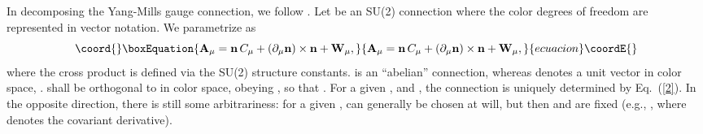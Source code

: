 \documentclass[a4paper,12pt]{article}
\providecommand{\re}[1]{~(\ref{#1})}\usepackage{useful_macros}
\begin{document}
In decomposing the Yang-Mills gauge connection, we follow
\cite{Cho:1980nv,Shabanov:1999xy,Shabanov:1999uv}. Let \myHighlight{$\mA_\mu$}\coordHE{} be an
SU(2) connection where the color degrees of freedom are represented in
vector notation. We parametrize \myHighlight{$\mA_\mu$}\coordHE{} as
\begin{equation}\coord{}\boxEquation{
\mA_\mu=\mn\, C_\mu +(\partial_\mu\mn)\times\mn +\mW_\mu,\label{2}
}{
\mA_\mu=\mn\, C_\mu +(\partial_\mu\mn)\times\mn +\mW_\mu,}{ecuacion}\coordE{}\end{equation}
where the cross product is defined via the SU(2) structure constants.
\coordHE{} is an ``abelian'' connection, whereas \myHighlight{$\mn$}\coordHE{} denotes a unit
vector in color space, \coordHE{}. \myHighlight{$\mW_\mu$}\coordHE{} shall be orthogonal
to \myHighlight{$\mn$}\coordHE{} in color space, obeying \coordHE{}, so that
\coordHE{}. For a given \myHighlight{$\mn$}\coordHE{}, \coordHE{} and \myHighlight{$\mW_\mu$}\coordHE{}, the
connection \myHighlight{$\mA_\mu$}\coordHE{} is uniquely determined by Eq.\re{2}. In the
opposite direction, there is still some arbitrariness: for a given
\myHighlight{$\mA_\mu$}\coordHE{}, \myHighlight{$\mn$}\coordHE{} can generally be chosen at will, but then \coordHE{} and
\myHighlight{$\mW_\mu$}\coordHE{} are fixed (e.g., \coordHE{}, where
\coordHE{} denotes the covariant derivative).
\end{document}
